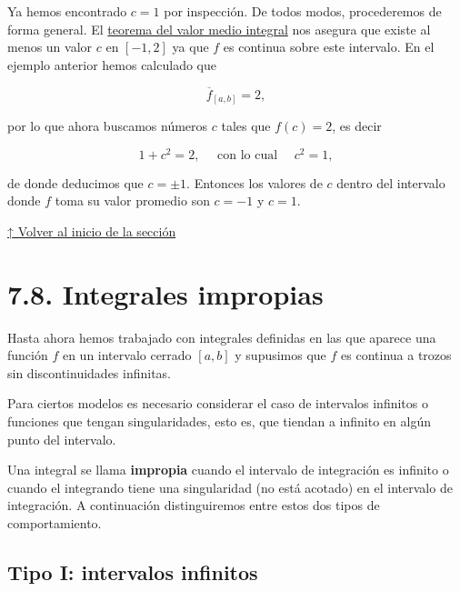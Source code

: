 \documentclass[
  letterpaper,
]{book}
\theoremstyle{plain}
\theoremstyle{remark}
\begin{document}
\begin{tcolorbox}[enhanced jigsaw, opacityback=0, left=2mm, opacitybacktitle=0.6, toprule=.15mm, bottomrule=.15mm, colbacktitle=quarto-callout-tip-color!10!white, titlerule=0mm, bottomtitle=1mm, title=\textcolor{quarto-callout-tip-color}{\faLightbulb}\hspace{0.5em}{Solución}, toptitle=1mm, colframe=quarto-callout-tip-color-frame, colback=white, breakable, rightrule=.15mm, arc=.35mm, leftrule=.75mm, coltitle=black]

Ya hemos encontrado \(c=1\) por inspección. De todos modos, procederemos
de forma general. El \hyperref[teo-valor-medio-integral]{teorema del
valor medio integral} nos asegura que existe al menos un valor \(c\) en
\([-1,2]\) ya que \(f\) es continua sobre este intervalo. En el ejemplo
anterior hemos calculado que

\[
\overline{f}_{[a,b]}=2,
\]

por lo que ahora buscamos números \(c\) tales que \(f(c)=2\), es decir

\[
1+c^2=2, \quad \text{ con lo cual } \quad c^2=1,
\]

de donde deducimos que \(c=\pm 1\). Entonces los valores de \(c\) dentro
del intervalo donde \(f\) toma su valor promedio son \(c=-1\) y \(c=1\).

\end{tcolorbox}

\hyperref[seccion_6.5]{↑ Volver al inicio de la sección}

\section{7.8. Integrales impropias}\label{seccion_7.8}

Hasta ahora hemos trabajado con integrales definidas en las que aparece
una función \(f\) en un intervalo cerrado \([a,b]\) y supusimos que
\(f\) es continua a trozos sin discontinuidades infinitas.

Para ciertos modelos es necesario considerar el caso de intervalos
infinitos o funciones que tengan singularidades, esto es, que tiendan a
infinito en algún punto del intervalo.

Una integral se llama \textbf{impropia} cuando el intervalo de
integración es infinito o cuando el integrando tiene una singularidad
(no está acotado) en el intervalo de integración. A continuación
distinguiremos entre estos dos tipos de comportamiento.

\subsection{Tipo I: intervalos
infinitos}\label{tipo-i-intervalos-infinitos}
\end{document}
